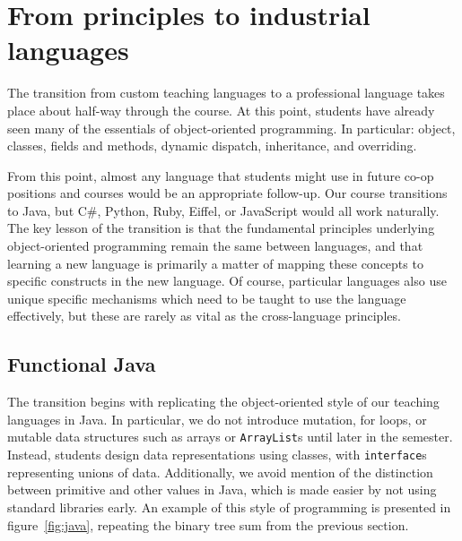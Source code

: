 \documentclass[submission,copyright]{eptcs}
\begin{document}
\section{From principles to industrial languages}
\label{sec:industrial}

The transition from custom teaching languages to a professional
language takes place about half-way through the course.  At this
point, students have already seen many of the essentials of
object-oriented programming. In particular: object, classes, fields
and methods, dynamic dispatch, inheritance, and overriding.

From this point, almost any language that students might use in future
co-op positions and courses would be an appropriate follow-up.  Our
course transitions to Java, but C\#, Python, Ruby, Eiffel, or
JavaScript would all work naturally.  The key lesson of the transition
is that the fundamental principles underlying object-oriented
programming remain the same between languages, and that learning a new
language is primarily a matter of mapping these concepts to specific
constructs in the new language.  Of course, particular languages also
use unique specific mechanisms which need to be taught to use the
language effectively, but these are rarely as vital as the
cross-language principles.

\subsection{Functional Java}

The transition begins with replicating the object-oriented style of
our teaching languages in Java.  In particular, we do not introduce
mutation, for loops, or mutable data structures such as arrays or
\texttt{ArrayList}s until later in the semester.  Instead, students
design data representations using classes, with \texttt{interface}s
representing unions of data.  Additionally, we avoid mention of the
distinction between primitive and other values in Java, which is made
easier by not using standard libraries early.  An example of this
style of programming is presented in figure~\ref{fig:java}, repeating
the binary tree sum from the previous section.
\end{document}
